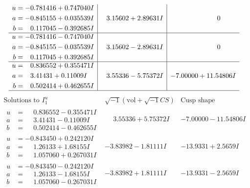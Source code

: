 \documentclass[1p]{elsarticle_modified}
\theoremstyle{definition}
\newcommand{\I}{\sqrt{-1}}
\begin{document}
$$\begin{array}{c|c|c}
\begin{aligned}
u &= -0.781416 + 0.747040 I \\
a &= -0.845155 + 0.035539 I \\
b &= \phantom{-}0.117045 - 0.392685 I\end{aligned}
 & \phantom{-}3.15602 + 2.89631 I & \phantom{-0.000000 } 0 \\ \hline\begin{aligned}
u &= -0.781416 - 0.747040 I \\
a &= -0.845155 - 0.035539 I \\
b &= \phantom{-}0.117045 + 0.392685 I\end{aligned}
 & \phantom{-}3.15602 - 2.89631 I & \phantom{-0.000000 } 0 \\ \hline\begin{aligned}
u &= \phantom{-}0.836552 + 0.355471 I \\
a &= \phantom{-}3.41431 + 0.11009 I \\
b &= \phantom{-}0.502414 + 0.462655 I\end{aligned}
 & \phantom{-}3.55336 - 5.75372 I & -7.00000 + 11.54806 I\\
 \hline 
 \end{array}$$\newpage$$\begin{array}{c|c|c}  
\text{Solutions to }I^u_{1}& \I (\text{vol} + \sqrt{-1}CS) & \text{Cusp shape}\\
 \hline 
\begin{aligned}
u &= \phantom{-}0.836552 - 0.355471 I \\
a &= \phantom{-}3.41431 - 0.11009 I \\
b &= \phantom{-}0.502414 - 0.462655 I\end{aligned}
 & \phantom{-}3.55336 + 5.75372 I & -7.00000 - 11.54806 I \\ \hline\begin{aligned}
u &= -0.843450 + 0.242120 I \\
a &= \phantom{-}1.26133 + 1.68155 I \\
b &= \phantom{-}1.057060 + 0.267031 I\end{aligned}
 & -3.83982 - 1.81111 I & -13.9331 + 2.5659 I \\ \hline\begin{aligned}
u &= -0.843450 - 0.242120 I \\
a &= \phantom{-}1.26133 - 1.68155 I \\
b &= \phantom{-}1.057060 - 0.267031 I\end{aligned}
 & -3.83982 + 1.81111 I & -13.9331 - 2.5659 I \\ \hline\begin{aligned}

\end{aligned}
\end{array}$$
\end{document}
